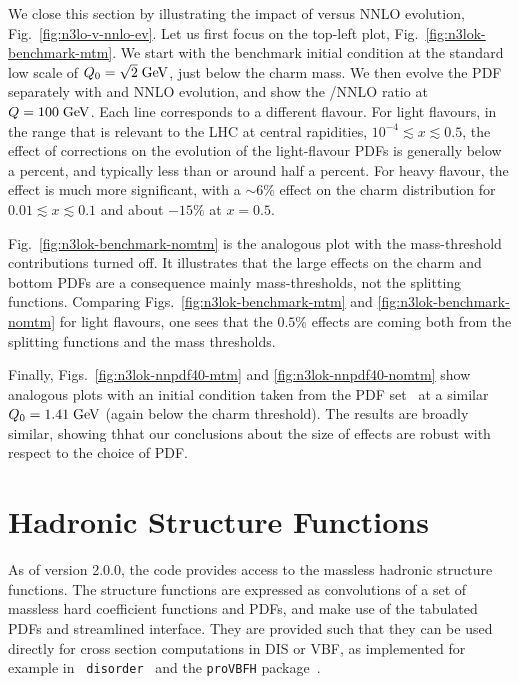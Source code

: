 We close this section by illustrating the impact of \ntlo versus NNLO
evolution, Fig.~\ref{fig:n3lo-v-nnlo-ev}.
%
Let us first focus on the top-left plot,
Fig.~\ref{fig:n3lok-benchmark-mtm}.
%
We start with the benchmark initial condition at the standard low
scale of $Q_0 = \sqrt{2}\;\mathrm{GeV}$, just below the charm mass.
%
We then evolve the PDF separately with \ntlo and NNLO evolution, and
show the \ntlo/NNLO ratio at $Q = 100\;\mathrm{GeV}$.
%
Each line corresponds to a different flavour.
%
For light flavours, in the range that is relevant to the LHC at
central rapidities, $10^{-4} \lesssim x \lesssim 0.5$, the effect of
\ntlo corrections on the evolution of the light-flavour PDFs is
generally below a percent, and typically less than or around half a
percent.
%
For heavy flavour, the effect is much more significant, with a
$\sim 6\%$ effect on the charm distribution for $0.01 \lesssim x
\lesssim 0.1$ and about $-15\%$ at $x=0.5$.

Fig.~\ref{fig:n3lok-benchmark-nomtm} is the analogous plot with the
\ntlo mass-threshold contributions turned off.
%
It illustrates that the large effects on the charm and bottom PDFs are
a consequence mainly \ntlo mass-thresholds, not the \ntlo splitting functions.
%
Comparing Figs.~\ref{fig:n3lok-benchmark-mtm} and
\ref{fig:n3lok-benchmark-nomtm} for light flavours, one sees that the $0.5\%$
effects are coming both from the \ntlo splitting functions and the
\ntlo mass thresholds.

Finally, Figs.~\ref{fig:n3lok-nnpdf40-mtm} and
\ref{fig:n3lok-nnpdf40-nomtm} show analogous plots with an initial
condition taken from the  PDF
set~\cite{NNPDF:2021njg} at a similar $Q_0 = 1.41 \;\mathrm{GeV}$ (again below
the charm threshold).
%
The results are broadly similar, showing thhat our conclusions about the
size of \ntlo effects are robust with respect to the choice of PDF.



\section{Hadronic Structure Functions}
\label{sec:structure-funcs}
As of \hoppet version 2.0.0, the code provides access to the massless
hadronic structure functions. The structure functions are expressed as
convolutions of a set of massless hard coefficient functions and PDFs,
and make use of the tabulated PDFs and streamlined interface.  They
are provided such that they can be used directly for cross section
computations in DIS or VBF, as implemented for example in {\tt
  disorder}~\cite{Karlberg:2024hnl} and the {\tt proVBFH}
package~\cite{Cacciari:2015jma,Dreyer:2016oyx,Dreyer:2018qbw,Dreyer:2018rfu,Dreyer:2020urf,Dreyer:2020xaj}.

